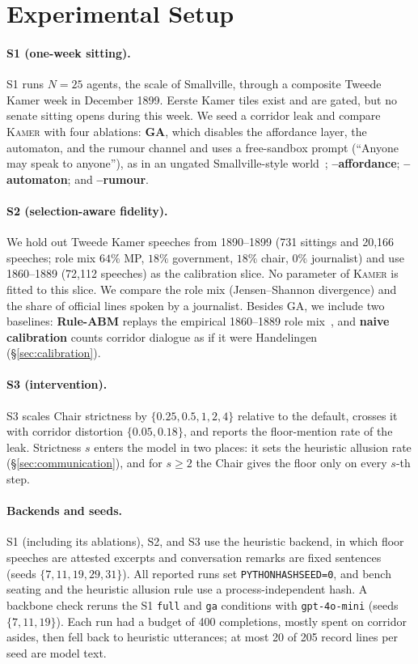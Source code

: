 \documentclass[sigconf,review,anonymous]{acmart}
\newcommand{\sys}{\textsc{Kamer}}
\begin{document}
\section{Experimental Setup}
\label{sec:experiments}

\paragraph{S1 (one-week sitting).} S1 runs $N{=}25$ agents, the scale of
Smallville, through a composite Tweede Kamer week in December 1899. Eerste
Kamer tiles exist and are gated, but no senate sitting opens during this
week. We seed a corridor leak and compare \sys{} with four ablations:
\textbf{GA}, which disables the affordance layer, the automaton, and the
rumour channel and uses a free-sandbox prompt (``Anyone may speak to
anyone''), as in an ungated Smallville-style
world~\cite{park2023generative}; \textbf{--affordance};
\textbf{--automaton}; and \textbf{--rumour}.

\paragraph{S2 (selection-aware fidelity).} We hold out Tweede Kamer
speeches from 1890--1899 (731 sittings and 20{,}166 speeches; role mix
$64\%$ MP, $18\%$ government, $18\%$ chair, $0\%$ journalist) and use
1860--1889 (72{,}112 speeches) as the calibration slice. No parameter of
\sys{} is fitted to this slice. We compare
the role mix (Jensen--Shannon divergence) and the share of official lines
spoken by a journalist. Besides GA, we include two baselines:
\textbf{Rule-ABM} replays the empirical 1860--1889 role
mix~\cite{epstein1996growing}, and \textbf{naive calibration} counts
corridor dialogue as if it were Handelingen (\S\ref{sec:calibration}).

\paragraph{S3 (intervention).} S3 scales Chair strictness by
$\{0.25,0.5,1,2,4\}$ relative to the default, crosses it with corridor
distortion $\{0.05,0.18\}$, and reports the floor-mention rate of the leak.
Strictness $s$ enters the model in two places: it sets the heuristic
allusion rate (\S\ref{sec:communication}), and for $s\geq2$ the Chair gives the
floor only on every $s$-th step.

\paragraph{Backends and seeds.} S1 (including its ablations), S2, and S3
use the heuristic backend, in which floor speeches are attested excerpts and conversation remarks are
fixed sentences (seeds $\{7,11,19,29,31\}$). All reported runs set
\texttt{PYTHONHASHSEED=0}, and bench seating and the heuristic allusion
rule use a process-independent hash. A backbone check reruns the
S1 \texttt{full} and \texttt{ga} conditions with \texttt{gpt-4o-mini}
(seeds $\{7,11,19\}$). Each run had a budget of 400 completions, mostly
spent on corridor asides, then fell back to heuristic utterances; at most
20 of 205 record lines per seed are model text.
\end{document}
